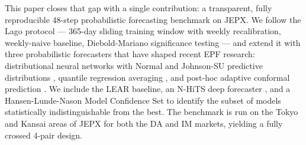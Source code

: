 \documentclass[review,3p,times,authoryear]{elsarticle}
\begin{document}
This paper closes that gap with a single contribution: a transparent, fully reproducible 48-step probabilistic forecasting benchmark on JEPX. We follow the Lago \citep{lago2021} protocol --- 365-day sliding training window with weekly recalibration, weekly-naive baseline, Diebold-Mariano significance testing --- and extend it with three probabilistic forecasters that have shaped recent EPF research: distributional neural networks with Normal and Johnson-SU predictive distributions \citep{marcjasz2023}, quantile regression averaging \citep{uniejewski2021}, and post-hoc adaptive conformal prediction \citep{gibbs2021}. We include the LEAR baseline, an N-HiTS deep forecaster \citep{nhits2023}, and a Hansen-Lunde-Nason \citep{hansen2011} Model Confidence Set to identify the subset of models statistically indistinguishable from the best. The benchmark is run on the Tokyo and Kansai areas of JEPX for both the DA and IM markets, yielding a fully crossed 4-pair design.
\end{document}
